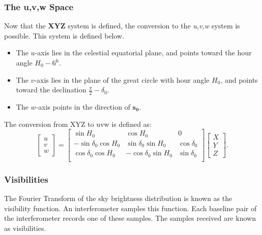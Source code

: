 \subsubsection{The u,v,w Space}
Now that the \textbf{XYZ} system is defined, the conversion to the \textit{u,v,w} system is possible. This system is defined below.
\begin{itemize}
    \item The $u$-axis lies in the celestial equatorial plane, and points toward the hour angle $H_0-6^\text{h}$.
    \item The $v$-axis lies in the plane of the great circle with hour angle $H_0$, and points toward the declination $\frac{\pi}{2}-\delta_0$.
    \item The $w$-axis points in the direction of $\mathbf{s_0}$.
\end{itemize}
The conversion from XYZ to uvw is defined as:
\begin{equation*}
\begin{bmatrix}
u\\v\\w
\end{bmatrix}=
\begin{bmatrix}
\sin H_0 & \cos H_0 & 0\\ 
-\sin \delta_0 \cos H_0 & \sin\delta_0\sin H_0 & \cos\delta_0\\
\cos \delta_0 \cos H_0 & -\cos\delta_0\sin H_0 & \sin\delta_0\\
\end{bmatrix} 
\begin{bmatrix}
X\\Y\\Z
\end{bmatrix}.
\end{equation*}
\subsubsection{Visibilities}
The Fourier Transform of the sky brightness distribution is known as the visibility function. An interferometer samples this function. Each baseline pair of the interferometer records one of these samples. The samples received are known as visibilities.
